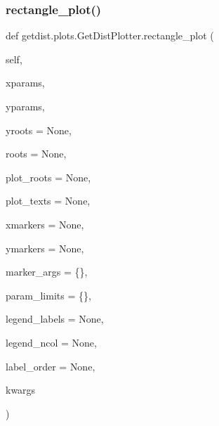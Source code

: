\subsubsection{\texorpdfstring{rectangle\+\_\+plot()}{rectangle\_plot()}}
{\footnotesize\ttfamily def getdist.\+plots.\+Get\+Dist\+Plotter.\+rectangle\+\_\+plot (\begin{DoxyParamCaption}\item[{}]{self,  }\item[{}]{xparams,  }\item[{}]{yparams,  }\item[{}]{yroots = {\ttfamily None},  }\item[{}]{roots = {\ttfamily None},  }\item[{}]{plot\+\_\+roots = {\ttfamily None},  }\item[{}]{plot\+\_\+texts = {\ttfamily None},  }\item[{}]{xmarkers = {\ttfamily None},  }\item[{}]{ymarkers = {\ttfamily None},  }\item[{}]{marker\+\_\+args = {\ttfamily \{\}},  }\item[{}]{param\+\_\+limits = {\ttfamily \{\}},  }\item[{}]{legend\+\_\+labels = {\ttfamily None},  }\item[{}]{legend\+\_\+ncol = {\ttfamily None},  }\item[{}]{label\+\_\+order = {\ttfamily None},  }\item[{}]{kwargs }\end{DoxyParamCaption})}

